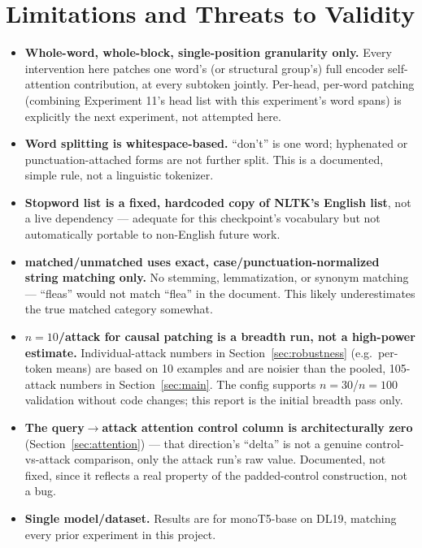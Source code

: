 \documentclass[11pt]{article}
\begin{document}
\section{Limitations and Threats to Validity}

\begin{itemize}
  \item \textbf{Whole-word, whole-block, single-position granularity only.} Every
  intervention here patches one word's (or structural group's) full encoder
  self-attention contribution, at every subtoken jointly. Per-head, per-word patching
  (combining Experiment 11's head list with this experiment's word spans) is explicitly
  the next experiment, not attempted here.
  \item \textbf{Word splitting is whitespace-based.} ``don't'' is one word; hyphenated
  or punctuation-attached forms are not further split. This is a documented, simple rule,
  not a linguistic tokenizer.
  \item \textbf{Stopword list is a fixed, hardcoded copy of NLTK's English list}, not a
  live dependency — adequate for this checkpoint's vocabulary but not automatically
  portable to non-English future work.
  \item \textbf{matched/unmatched uses exact, case/punctuation-normalized string
  matching only.} No stemming, lemmatization, or synonym matching — ``fleas'' would not
  match ``flea'' in the document. This likely underestimates the true matched category
  somewhat.
  \item \textbf{$n{=}10$/attack for causal patching is a breadth run, not a
  high-power estimate.} Individual-attack numbers in Section~\ref{sec:robustness}
  (e.g.\ per-token means) are based on 10 examples and are noisier than the pooled,
  105-attack numbers in Section~\ref{sec:main}. The config supports $n{=}30$/$n{=}100$
  validation without code changes; this report is the initial breadth pass only.
  \item \textbf{The query$\to$attack attention control column is architecturally zero}
  (Section~\ref{sec:attention}) — that direction's ``delta'' is not a genuine
  control-vs-attack comparison, only the attack run's raw value. Documented, not fixed,
  since it reflects a real property of the padded-control construction, not a bug.
  \item \textbf{Single model/dataset.} Results are for monoT5-base on DL19, matching
  every prior experiment in this project.
\end{itemize}
\end{document}
